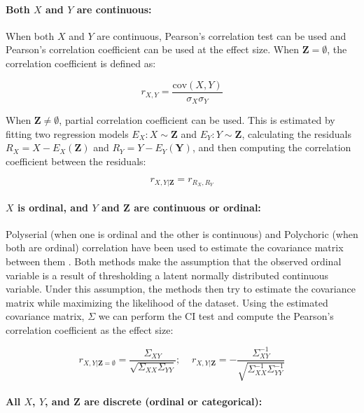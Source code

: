 \documentclass{uai2025} %
\begin{document}
\paragraph{Both $ X $ and $ Y $ are continuous: }
When both $ X $ and $ Y $ are continuous, Pearson's correlation test can be
used and Pearson's correlation coefficient can be used at the effect size. When
$ \bm{Z} = \emptyset $, the correlation coefficient is defined as:

\begin{equation}
	r_{X, Y} = \frac{\mathrm{cov}(X, Y)}{\sigma_X \sigma_Y}
\end{equation}

When $ \bm{Z} \neq \emptyset $, partial correlation coefficient can be used.
This is estimated by fitting two regression models $ E_X: X \sim \bm{Z} $ and $
E_Y: Y \sim \bm{Z} $, calculating the residuals $ R_X = X - E_X(\bm{Z}) $ and $
R_Y = Y - E_Y(\bm{Y}) $, and then computing the correlation coefficient between
the residuals:

\begin{equation}
	r_{X, Y \rvert \bm{Z}} = r_{R_X, R_Y}
\end{equation}

\paragraph{$ X $ is ordinal, and $ Y $ and $ \bm{Z} $  are continuous or ordinal: }

Polyserial (when one is ordinal and the other is continuous) and Polychoric
(when both are ordinal) correlation have been used to estimate the covariance
matrix between them \citep{Poon1987}. Both methods make the assumption that the
observed ordinal variable is a result of thresholding a latent normally
distributed continuous variable. Under this assumption, the methods then try to
estimate the covariance matrix while maximizing the likelihood of the dataset.
Using the estimated covariance matrix, $ \Sigma $ we can perform the CI test and compute 
the Pearson's correlation coefficient as the effect size:

\begin{equation}
	r_{X, Y \rvert \bm{Z} = \emptyset} = \frac{\Sigma_{XY}}{\sqrt{\Sigma_{XX} \Sigma_{YY}}}; \;\;\; \; r_{X, Y \rvert \bm{Z}} = - \frac{\Sigma^{-1}_{XY}}{\sqrt{\Sigma^{-1}_{XX} \Sigma^{-1}_{YY}}}
\end{equation}

\paragraph{All $ X $, $ Y $, and $ \bm{Z} $ are discrete (ordinal or categorical): }
\end{document}
